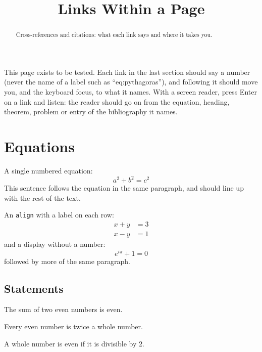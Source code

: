 \documentclass{ximera}
\title{Links Within a Page}
\begin{document}
\begin{abstract}
Cross-references and citations: what each link says and where it takes you.
\end{abstract}
\maketitle

This page exists to be tested. Each link in the last section should say a
number (never the name of a label such as ``eq:pythagoras''), and following
it should move you, and the keyboard focus, to what it names. With a screen
reader, press Enter on a link and listen: the reader should go on from the
equation, heading, theorem, problem or entry of the bibliography it names.

\section{Equations}\label{sec:equations}

A single numbered equation:
\begin{equation}\label{eq:pythagoras}
a^2+b^2=c^2
\end{equation}
This sentence follows the equation in the same paragraph, and should line
up with the rest of the text.

An \texttt{align} with a label on each row:
\begin{align}
x + y &= 3 \label{eq:sum}\\
x - y &= 1 \label{eq:difference}
\end{align}
and a display without a number:
\[ e^{i\pi} + 1 = 0 \]
followed by more of the same paragraph.

\subsection{Statements}\label{sec:statements}

\begin{theorem}\label{thm:parity}
The sum of two even numbers is even.
\end{theorem}

\begin{lemma}[Halving]\label{lem:halving}
Every even number is twice a whole number.
\end{lemma}

\begin{definition}\label{def:even}
A whole number is even if it is divisible by $2$.
\end{definition}
\end{document}
